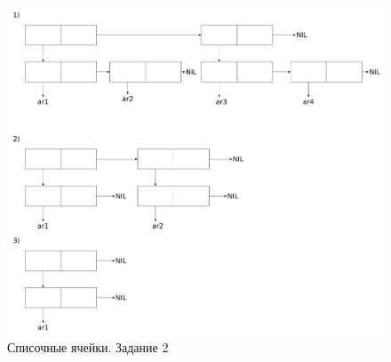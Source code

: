\begin{enumerate}[wide=0pt]
\begin{figure}[ht!]
	\centering
	\includegraphics[width=0.9\linewidth]{assets/task1/2.pdf}
	\caption{Списочные ячейки. Задание 2}
\end{figure}
\FloatBarrier

\end{enumerate}